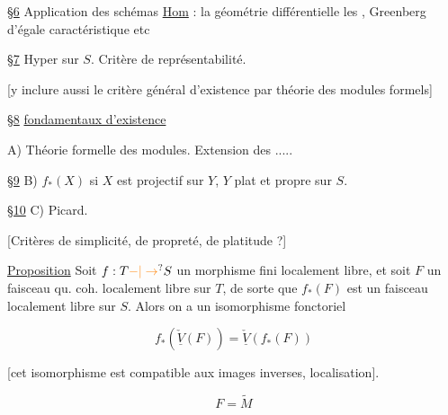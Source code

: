 
\uline{\S6} Application des schémas \uline{Hom} : la géométrie différentielle les , Greenberg d'égale caractéristique etc


\uline{\S7} Hyper sur $S$. Critère de représentabilité.

[y inclure aussi le critère général d'existence par théorie des modules formels]

\uline{\S8}   \uline{fondamentaux d'existence}

A) Théorie formelle des modules. Extension des .....

\uline{\S9} B)  $f_*(X)$ si $X$ est projectif sur $Y$, $Y$ plat et propre sur $S$.

\uline{\S10} C) Picard.


[Critères de simplicité, de propreté, de platitude ?]


\uline{Proposition} Soit $f:T\unsure{-|\to}S$ un morphisme fini localement libre, et soit  $F$ un faisceau qu. coh. localement libre sur $T$, de sorte que $f_*(F)$ est un faisceau  localement libre sur $S$. Alors on a un isomorphisme fonctoriel

\[
\boxed{f_*(\underline{\check V}(F))=\underline{\check V}(f_*(F))}
\]

[cet isomorphisme est compatible aux images inverses,  localisation].



\[
F=\widetilde M
\]

